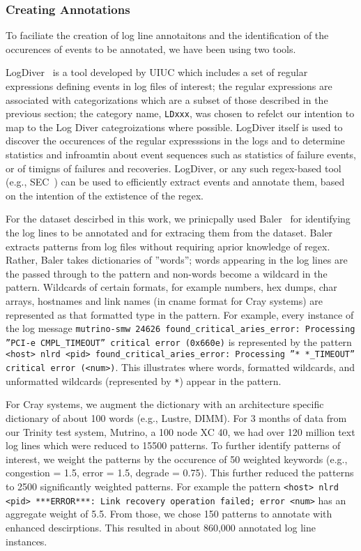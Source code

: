 \subsubsection{Creating Annotations}
\label{s:creating}
To faciliate the creation of log line annotaitons
and the identification of the occurences of events to be annotated,
we have been using two tools.

LogDiver~\cite{LogDiver} is a tool developed by UIUC which includes a set of regular expressions defining
events in log files of interest; the regular expressions are associated with categorizations
which are a subset of those described in the previous section; the
category name, \texttt{LDxxx}, was chosen to refelct our intention to map to the
Log Diver categroizations where possible.
LogDiver itself is used to discover the occurences of the regular
expresssions in the logs and to determine statistics and infroamtin about event sequences
such as statistics of failure events, or of timigns of failures and recoveries.
LogDiver, or any such regex-based tool (e.g., SEC~\cite{SEC}) can be used to efficiently extract events
and annotate them, based on the intention of the extistence of the regex.

For the dataset descirbed in this work, we prinicpally used Baler~\cite{Baler} for
identifying the log lines to be annotated and for extracing them from the dataset.
Baler extracts patterns from log files without requiring aprior knowledge of
regex. Rather, Baler takes dictionaries of ''words''; words appearing in the log lines
are the passed through to the pattern and non-words become a wildcard in the pattern.
Wildcards of certain formats, for example numbers, hex dumps, char arrays, hostnames and link names
(in cname format for Cray systems) are represented as that formatted type in the pattern.
For example, every instance of the log message \texttt{mutrino-smw 24626 found\_critical\_aries\_error: Processing ''PCI-e CMPL\_TIMEOUT'' critical error (0x660e)}
is represented by the pattern \texttt{<host> nlrd <pid> found\_critical\_aries\_error: Processing ''* *\_TIMEOUT'' critical error (<num>)}.
This illustrates where words, formatted wildcards, and unformatted wildcards (represented by \texttt{*}) appear in the pattern.

For Cray systems, we augment
the dictionary with an architecture specific dictionary of about 100 words (e.g., Lustre, DIMM).
For 3 months of data from our Trinity test system, Mutrino, a 100 node XC 40,
we had over 120 million text log lines which were reduced to 15500 patterns. To further identify patterns
of interest, we weight the patterns by the occurence of 50 weighted
keywords (e.g., congestion = 1.5, error = 1.5, degrade = 0.75). This further reduced the patterns
to 2500 significantly weighted patterns. For example the pattern
\texttt{<host> nlrd <pid> ***ERROR***: Link recovery operation failed; error <num>} has
an aggregate weight of 5.5. From those, we chose 150
patterns to annotate with enhanced descirptions. This resulted in about 860,000
annotated log line instances.

